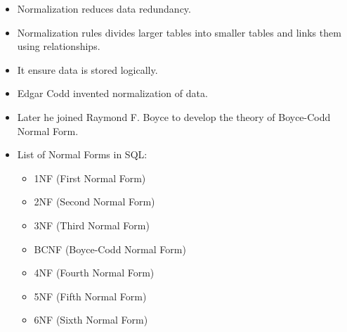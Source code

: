 \setlength{\columnsep}{3pt}
\begin{flushleft}
	
	\begin{itemize}
		\item Normalization reduces data redundancy. 
		\item Normalization rules divides larger tables into smaller tables and links them using relationships. 
		\item It ensure data is stored logically.
		\item Edgar Codd invented normalization of data.
		\item Later he joined Raymond F. Boyce to develop the theory of Boyce-Codd Normal Form.
		\item List of Normal Forms in SQL:
		\begin{itemize}
			\item 1NF (First Normal Form)
			\item 2NF (Second Normal Form)
			\item 3NF (Third Normal Form)
			\item BCNF (Boyce-Codd Normal Form)
			\item 4NF (Fourth Normal Form)
			\item 5NF (Fifth Normal Form)
			\item 6NF (Sixth Normal Form)
		\end{itemize}
		
	\end{itemize}

	
\end{flushleft}



